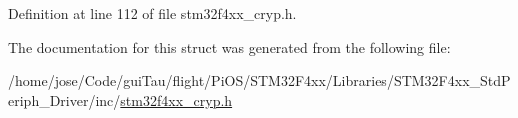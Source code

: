 Definition at line 112 of file stm32f4xx\-\_\-cryp.\-h.



The documentation for this struct was generated from the following file\-:\begin{DoxyCompactItemize}
\item 
/home/jose/\-Code/gui\-Tau/flight/\-Pi\-O\-S/\-S\-T\-M32\-F4xx/\-Libraries/\-S\-T\-M32\-F4xx\-\_\-\-Std\-Periph\-\_\-\-Driver/inc/\hyperlink{stm32f4xx__cryp_8h}{stm32f4xx\-\_\-cryp.\-h}\end{DoxyCompactItemize}
